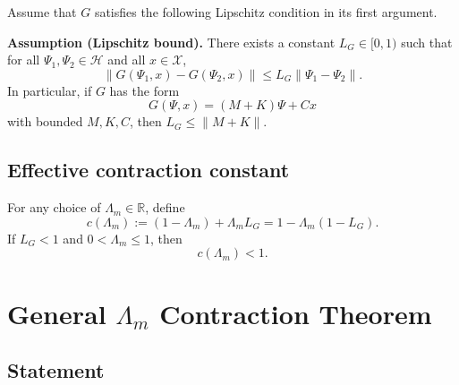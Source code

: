 \documentclass[11pt]{article}
\begin{document}
Assume that $G$ satisfies the following Lipschitz condition in its first argument.

\medskip

\noindent
\textbf{Assumption (Lipschitz bound).}
There exists a constant $L_G \in [0,1)$ such that for all $\Psi_1,\Psi_2 \in \mathcal{H}$ and all $x \in \mathcal{X}$,
\begin{equation}\label{eq:Lip_G}
  \|G(\Psi_1,x) - G(\Psi_2,x)\|
  \leq
  L_G \|\Psi_1 - \Psi_2\|.
\end{equation}
In particular, if $G$ has the form
\begin{equation}
  G(\Psi,x) = (M+K)\Psi + Cx
\end{equation}
with bounded $M,K,C$, then $L_G \leq \|M+K\|$.

\subsection{Effective contraction constant}

For any choice of $\Lambda_m \in \mathbb{R}$, define
\begin{equation}\label{eq:c_Lm_def}
  c(\Lambda_m) := (1 - \Lambda_m) + \Lambda_m L_G
  = 1 - \Lambda_m(1 - L_G).
\end{equation}
If $L_G < 1$ and $0 < \Lambda_m \leq 1$, then
\begin{equation}
  c(\Lambda_m) < 1.
\end{equation}

\section{General $\Lambda_m$ Contraction Theorem}

\subsection{Statement}
\end{document}
